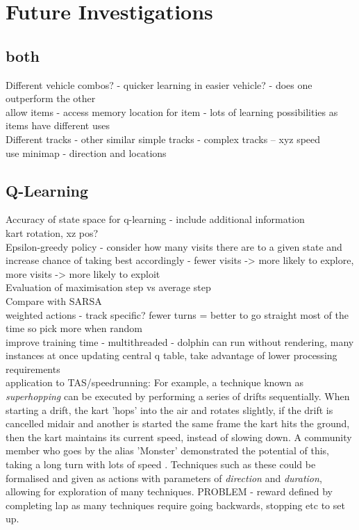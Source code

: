 
\chapter{Future Investigations}
\section{both}
Different vehicle combos? - quicker learning in easier vehicle? - does one outperform the other
\\ allow items - access memory location for item - lots of learning possibilities as items have different uses
\\Different tracks - other similar simple tracks - complex tracks -- xyz speed
\\ use minimap - direction and locations

\section{Q-Learning}
Accuracy of state space for q-learning - include additional information\\
kart rotation, xz pos?
\\ Epsilon-greedy policy - consider how many visits there are to a given state and increase chance of taking best accordingly - fewer visits -> more likely to explore, more visits -> more likely to exploit
\\ Evaluation of maximisation step vs average step
\\ Compare with SARSA
\\ weighted actions - track specific? fewer turns = better to go straight most of the time so pick more when random
\\ improve training time - multithreaded - dolphin can run without rendering, many instances at once updating central q table, take advantage of lower processing requirements
\\application to TAS/speedrunning: For example, a technique known as \textit{superhopping} can be executed by performing a series of drifts sequentially. When starting a drift, the kart 'hops' into the air and rotates slightly, if the drift is cancelled midair and another is started the same frame the kart hits the ground, then the kart maintains its current speed, instead of slowing down. A community member who goes by the alias 'Monster' demonstrated the potential of this, taking a long turn with lots of speed \cite{Superhopping}. Techniques such as these could be formalised and given as actions with parameters of \textit{direction} and \textit{duration}, allowing for exploration of many techniques. PROBLEM - reward defined by completing lap as many techniques require going backwards, stopping etc to set up.
